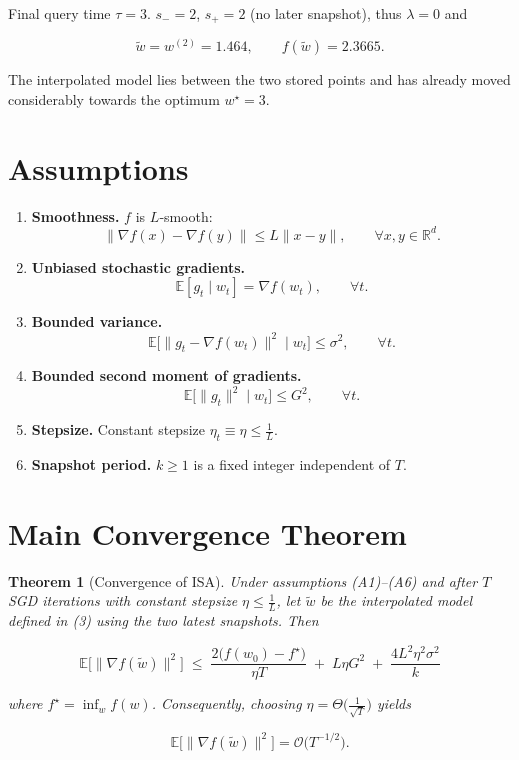 \documentclass{article}
\newtheorem{theorem}{Theorem}
\begin{document}
Final query time $\tau=3$.  
$s_{-}=2$, $s_{+}=2$ (no later snapshot), thus $\lambda=0$ and  

\[
\tilde w = w^{(2)} = 1.464,\qquad f(\tilde w)=2.3665 .
\]

The interpolated model lies between the two stored points and has
already moved considerably towards the optimum $w^\star=3$.

\section*{Assumptions}
\begin{enumerate}[label=(A\arabic*)]
\item \textbf{Smoothness.} $f$ is $L$‑smooth:
\[
\|\nabla f(x)-\nabla f(y)\|\le L\|x-y\|,\qquad\forall x,y\in\mathbb{R}^d .
\tag{A1}
\]
\item \textbf{Unbiased stochastic gradients.}
\[
\mathbb{E}[g_t\mid w_t]=\nabla f(w_t),\qquad\forall t .
\tag{A2}
\]
\item \textbf{Bounded variance.}
\[
\mathbb{E}\big[\|g_t-\nabla f(w_t)\|^2\mid w_t\big]\le\sigma^2 ,
\qquad\forall t .
\tag{A3}
\]
\item \textbf{Bounded second moment of gradients.}
\[
\mathbb{E}\big[\|g_t\|^2\mid w_t\big]\le G^2 ,\qquad\forall t .
\tag{A4}
\]
\item \textbf{Stepsize.} Constant stepsize $\eta_t\equiv\eta\le\frac{1}{L}$.
\item \textbf{Snapshot period.} $k\ge 1$ is a fixed integer independent of $T$.
\end{enumerate}

\section*{Main Convergence Theorem}
\begin{theorem}[Convergence of ISA]\label{thm:isa}
Under assumptions (A1)–(A6) and after $T$ SGD iterations with
constant stepsize $\eta\le \frac{1}{L}$,
let $\tilde w$ be the interpolated model defined in (3) using the two
latest snapshots.  Then  

\[
\boxed{\;
\mathbb{E}\big[\|\nabla f(\tilde w)\|^2\big]\;
\le\;
\frac{2\big(f(w_0)-f^{\star}\big)}{\eta T}
\;+\;
L\eta G^2
\;+\;
\frac{4L^2\eta^2\sigma^2}{k}
\;}
\tag{4}
\]

where $f^{\star}=\inf_{w}f(w)$.  Consequently, choosing
$\eta=\Theta\!\big(\tfrac{1}{\sqrt{T}}\big)$ yields  

\[
\mathbb{E}\big[\|\nabla f(\tilde w)\|^2\big]=
\mathcal{O}\!\big(T^{-1/2}\big).
\]
\end{theorem}
\end{document}
